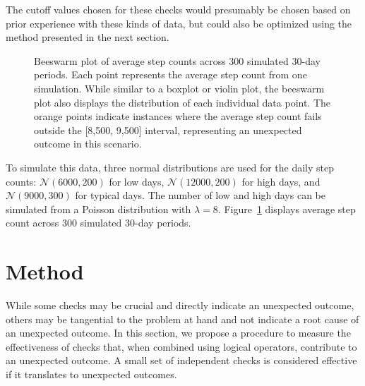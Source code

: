 \documentclass[
  12pt,
]{interact}
\begin{document}
The cutoff values chosen for these checks would presumably be chosen
based on prior experience with these kinds of data, but could also be
optimized using the method presented in the next section.

\label{cell-fig-step-count}
\begin{figure}[H]


\caption{\label{fig-step-count}Beeswarm plot of average step counts
across 300 simulated 30-day periods. Each point represents the average
step count from one simulation. While similar to a boxplot or violin
plot, the beeswarm plot also displays the distribution of each
individual data point. The orange points indicate instances where the
average step count fails outside the {[}8,500, 9,500{]} interval,
representing an unexpected outcome in this scenario.}

\end{figure}%

To simulate this data, three normal distributions are used for the daily
step counts: \(\mathcal{N}(6000, 200)\) for low days,
\(\mathcal{N}(12000, 200)\) for high days, and
\(\mathcal{N}(9000, 300)\) for typical days. The number of low and high
days can be simulated from a Poisson distribution with \(\lambda = 8\).
Figure~\ref{fig-step-count} displays average step count across 300
simulated 30-day periods.

\section{Method}\label{sec-method}

While some checks may be crucial and directly indicate an unexpected
outcome, others may be tangential to the problem at hand and not
indicate a root cause of an unexpected outcome. In this section, we
propose a procedure to measure the effectiveness of checks that, when
combined using logical operators, contribute to an unexpected outcome. A
small set of independent checks is considered effective if it translates
to unexpected outcomes.
\end{document}
